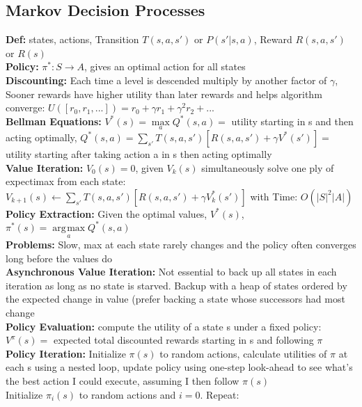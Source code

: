 \documentclass[11pt, a4paper]{article}
\DeclareMathOperator*{\argmax}{\arg\!\max}
\begin{document}
\begin{multicols*}{1}
        \section*{Markov Decision Processes}
            \textbf{Def:} states, actions, Transition $T(s, a, s')$ or $P(s' | s, a)$, Reward $R(s, a, s')$ or $R(s)$\\
            \textbf{Policy:} $\pi^{*}: S \to A$, gives an optimal action for all states\\
            \textbf{Discounting:} Each time a level is descended multiply by another factor of $\gamma$, Sooner rewards have higher utility than later rewards and helps algorithm converge: $U([r_0, r_1, ...]) = r_0 + \gamma r_1 + \gamma^2r_2 + ...$\\
            \textbf{Bellman Equations:} $V^*(s) = \max\limits_{a} Q^*(s, a) = $ utility starting in s and then acting optimally, $Q^*(s, a) = \sum\limits_{s'} T(s, a, s') [R(s, a, s') + \gamma V^*(s')] = $ utility starting after taking action a in s then acting optimally\\
            \textbf{Value Iteration:} $V_0(s) = 0$, given $V_k(s)$ simultaneously solve one ply of expectimax from each state: $V_{k + 1}(s) \gets \sum\limits_{s'} T(s, a, s') [R(s, a, s') + \gamma V_k^*(s')]$ with Time: $O(|S|^2|A|)$\\
            \textbf{Policy Extraction:} Given the optimal values, $V^*(s)$, $\pi^*(s) = \argmax\limits_{a} Q^*(s, a)$\\
            \textbf{Problems:} Slow, max at each state rarely changes and the policy often converges long before the values do\\
            \textbf{Asynchronous Value Iteration:} Not essential to back up all states in each iteration as long as no state is starved. Backup with a heap of states ordered by the expected change in value (prefer backing a state whose successors had most change\\
            \textbf{Policy Evaluation:} compute the utility of a state s under a fixed policy: $V^\pi(s) =$ expected total discounted rewards starting in s and following $\pi$\\
            \textbf{Policy Iteration:} Initialize $\pi(s)$ to random actions, calculate utilities of $\pi$ at each s using a nested loop, update policy using one-step look-ahead to see what's the best action I could execute, assuming I then follow $\pi(s)$\\
            \hspace*{5 mm}Initialize $\pi_i(s)$ to random actions and $i = 0$. Repeat:\\

\end{multicols*}
\end{document}
